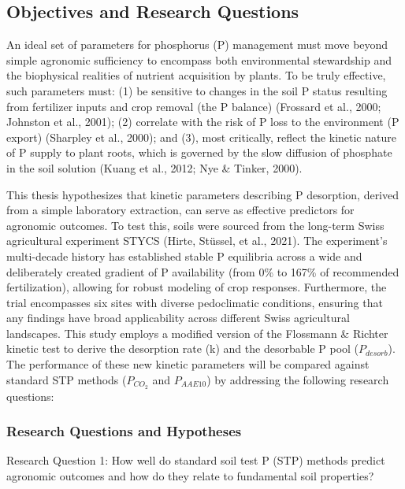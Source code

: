 \documentclass[
  a4paper,
]{article}
\begin{document}
\subsection{Objectives and Research
Questions}\label{objectives-and-research-questions}

An ideal set of parameters for phosphorus (P) management must move
beyond simple agronomic sufficiency to encompass both environmental
stewardship and the biophysical realities of nutrient acquisition by
plants. To be truly effective, such parameters must: (1) be sensitive to
changes in the soil P status resulting from fertilizer inputs and crop
removal (the P balance) (Frossard et al., 2000; Johnston et al., 2001);
(2) correlate with the risk of P loss to the environment (P export)
(Sharpley et al., 2000); and (3), most critically, reflect the kinetic
nature of P supply to plant roots, which is governed by the slow
diffusion of phosphate in the soil solution (Kuang et al., 2012; Nye \&
Tinker, 2000).

This thesis hypothesizes that kinetic parameters describing P
desorption, derived from a simple laboratory extraction, can serve as
effective predictors for agronomic outcomes. To test this, soils were
sourced from the long-term Swiss agricultural experiment STYCS (Hirte,
Stüssel, et al., 2021). The experiment's multi-decade history has
established stable P equilibria across a wide and deliberately created
gradient of P availability (from 0\% to 167\% of recommended
fertilization), allowing for robust modeling of crop responses.
Furthermore, the trial encompasses six sites with diverse pedoclimatic
conditions, ensuring that any findings have broad applicability across
different Swiss agricultural landscapes. This study employs a modified
version of the Flossmann \& Richter kinetic test to derive the
desorption rate (k) and the desorbable P pool (\(P_{desorb}\)). The
performance of these new kinetic parameters will be compared against
standard STP methods (\(P_{CO_2}\) and \(P_{AAE10}\)) by addressing the
following research questions:

\subsubsection{Research Questions and
Hypotheses}\label{research-questions-and-hypotheses}

Research Question 1: How well do standard soil test P (STP) methods
predict agronomic outcomes and how do they relate to fundamental soil
properties?
\end{document}
